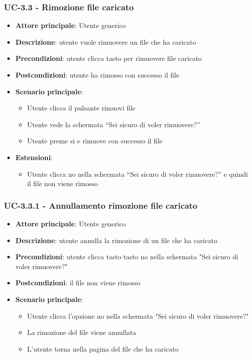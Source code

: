 \documentclass[11pt,a4paper]{article}
\begin{document}
\subsubsection{UC-3.3 - Rimozione file caricato}
\begin{itemize}
    \item \textbf{Attore principale}: Utente generico
    \item \textbf{Descrizione}: utente vuole rimuovere un file che ha caricato
    \item \textbf{Precondizioni}: utente clicca tasto per rimuovere file caricato
    \item \textbf{Postcondizioni}: utente ha rimosso con successo il file
    \item \textbf{Scenario principale}:
        \begin{itemize}
            \item Utente clicca il pulsante rimuovi file
            \item Utente vede la schermata “Sei sicuro di voler rimuovere?”
            \item Utente preme si e rimuove con successo il file
        \end{itemize}
        \item \textbf{Estensioni}:
        \begin{itemize}
            \item Utente clicca no nella schermata “Sei sicuro di voler rimuovere?” e quindi il file non viene rimosso
        \end{itemize}
\end{itemize}

\subsubsection{UC-3.3.1 - Annullamento rimozione file caricato}
\begin{itemize}
    \item \textbf{Attore principale}: Utente generico
    \item \textbf{Descrizione}: utente annulla la rimozione di un file che ha caricato
    \item \textbf{Precondizioni}: utente clicca tasto tasto no nella schermata "Sei sicuro di voler rimuovere?"
    \item \textbf{Postcondizioni}: il file non viene rimosso
    \item \textbf{Scenario principale}:
        \begin{itemize}
            \item Utente clicca l'opzione no nella schermata "Sei sicuro di voler rimuovere?"
            \item La rimozione del file viene annullata
            \item L'utente torna nella pagina del file che ha caricato
        \end{itemize}
\end{itemize}
\end{document}
